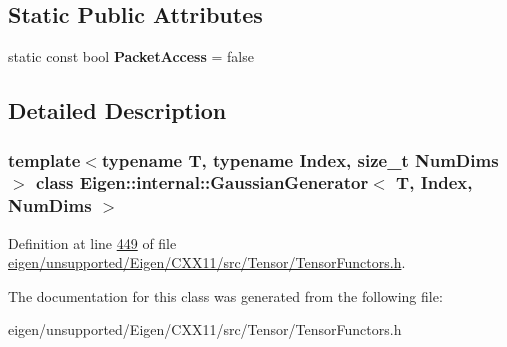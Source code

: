 \subsection*{Static Public Attributes}
\begin{DoxyCompactItemize}
\item 
\mbox{\label{class_eigen_1_1internal_1_1_gaussian_generator_a093af06f395c639ef03f9d2fcd4b05ba}} 
static const bool {\bfseries Packet\+Access} = false
\end{DoxyCompactItemize}


\subsection{Detailed Description}
\subsubsection*{template$<$typename T, typename Index, size\+\_\+t Num\+Dims$>$\newline
class Eigen\+::internal\+::\+Gaussian\+Generator$<$ T, Index, Num\+Dims $>$}



Definition at line \hyperlink{eigen_2unsupported_2_eigen_2_c_x_x11_2src_2_tensor_2_tensor_functors_8h_source_l00449}{449} of file \hyperlink{eigen_2unsupported_2_eigen_2_c_x_x11_2src_2_tensor_2_tensor_functors_8h_source}{eigen/unsupported/\+Eigen/\+C\+X\+X11/src/\+Tensor/\+Tensor\+Functors.\+h}.



The documentation for this class was generated from the following file\+:\begin{DoxyCompactItemize}
\item 
eigen/unsupported/\+Eigen/\+C\+X\+X11/src/\+Tensor/\+Tensor\+Functors.\+h\end{DoxyCompactItemize}
